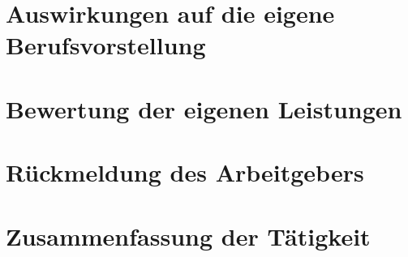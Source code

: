 \documentclass[10pt,a4paper]{report}
\begin{document}
\section{Auswirkungen auf die eigene Berufsvorstellung}

\section{Bewertung der eigenen Leistungen}

\section{Rückmeldung des Arbeitgebers}

\section{Zusammenfassung der Tätigkeit}

\printbibliography
	                      	
\end{document}
